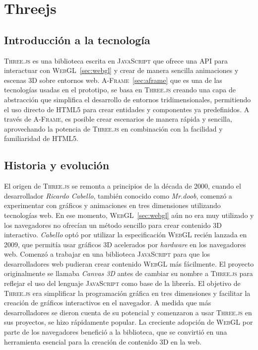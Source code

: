 \documentclass[a4paper, 11pt]{book}
\begin{document}
\section{Threejs}
\label{sec:threejs}
\subsection{Introducción a la tecnología}
\textsc{Three.js} es una biblioteca escrita en \textsc{JavaScript} que ofrece una \textsc{API} para interactuar con \textsc{WebGL}~\ref{sec:webgl} y crear de manera sencilla animaciones y escenas \gls{3D} sobre entornos web. 
\textsc{A-Frame}~\ref{sec:aframe} que es una de las tecnologías usadas en el prototipo, se basa en \textsc{Three.js} creando una capa de abstracción que simplifica el desarrollo de entornos tridimensionales, permitiendo el uso directo de \textsc{HTML5} para crear entidades y componentes ya predefinidos. A través de \textsc{A-Frame}, es posible crear escenarios de manera rápida y sencilla, aprovechando la potencia de \textsc{Three.js} en combinación con la facilidad y familiaridad de \textsc{HTML5}.
\subsection{Historia y evolución}
El origen de \textsc{Three.js} se remonta a principios de la década de 2000, cuando el desarrollador \emph{Ricardo Cabello}, también conocido como \emph{Mr.doob}, comenzó a experimentar con gráficos y animaciones en tres dimensiones utilizando tecnologías web. En ese momento, \textsc{WebGL}~\ref{sec:webgl} aún no era muy utilizado y los navegadores no ofrecían un método sencillo para crear contenido \textsc{3D} interactivo.
\emph{Cabello} optó por utilizar la especificación \textsc{WebGL} recién lanzada en 2009, que permitía usar gráficos \textsc{3D} acelerados por \emph{\gls{hardware}} en los navegadores web. Comenzó a trabajar en una biblioteca \textsc{JavaScript} para que los desarrolladores web pudieran crear contenido \textsc{WebGL} más fácilmente.
El proyecto originalmente se llamaba \emph{Canvas 3D} antes de cambiar su nombre a \textsc{Three.js} para reflejar el uso del lenguaje \textsc{JavaScript} como base de la librería.
El objetivo de \textsc{Three.js} era simplificar la programación gráfica en tres dimensiones y facilitar la creación de gráficos interactivos en el navegador.
A medida que más desarrolladores se dieron cuenta de su potencial y comenzaron a usar \textsc{Three.js} en sus proyectos, se hizo rápidamente popular. La creciente adopción de \textsc{WebGL} por parte de los navegadores benefició a la biblioteca, que se convirtió en una herramienta esencial para la creación de contenido \textsc{3D} en la web.
\end{document}
